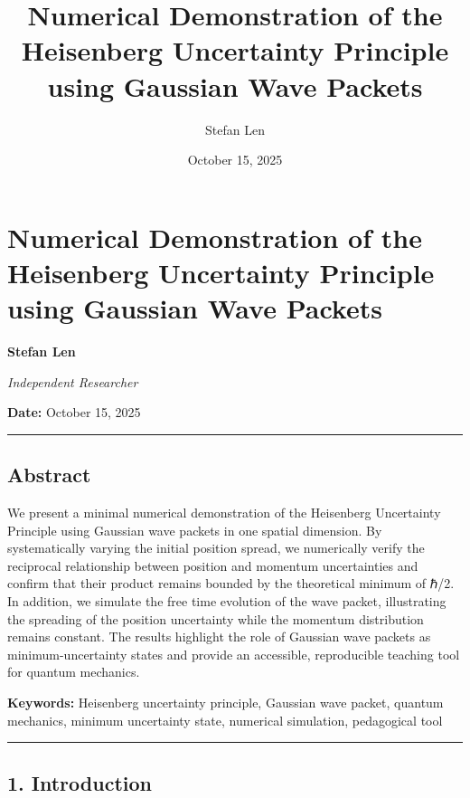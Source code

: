 \documentclass[
  11pt,
]{article}
\title{Numerical Demonstration of the Heisenberg Uncertainty Principle
using Gaussian Wave Packets}
\author{Stefan Len}
\date{October 15, 2025}
\begin{document}
\maketitle

\section{Numerical Demonstration of the Heisenberg Uncertainty Principle
using Gaussian Wave
Packets}\label{numerical-demonstration-of-the-heisenberg-uncertainty-principle-using-gaussian-wave-packets}

\textbf{Stefan Len}

\emph{Independent Researcher}

\textbf{Date:} October 15, 2025

\begin{center}\rule{0.5\linewidth}{0.5pt}\end{center}

\subsection{Abstract}\label{abstract}

We present a minimal numerical demonstration of the Heisenberg
Uncertainty Principle using Gaussian wave packets in one spatial
dimension. By systematically varying the initial position spread, we
numerically verify the reciprocal relationship between position and
momentum uncertainties and confirm that their product remains bounded by
the theoretical minimum of ℏ/2. In addition, we simulate the free time
evolution of the wave packet, illustrating the spreading of the position
uncertainty while the momentum distribution remains constant. The
results highlight the role of Gaussian wave packets as
minimum-uncertainty states and provide an accessible, reproducible
teaching tool for quantum mechanics.

\textbf{Keywords:} Heisenberg uncertainty principle, Gaussian wave
packet, quantum mechanics, minimum uncertainty state, numerical
simulation, pedagogical tool

\begin{center}\rule{0.5\linewidth}{0.5pt}\end{center}

\subsection{1. Introduction}\label{introduction}
\end{document}
